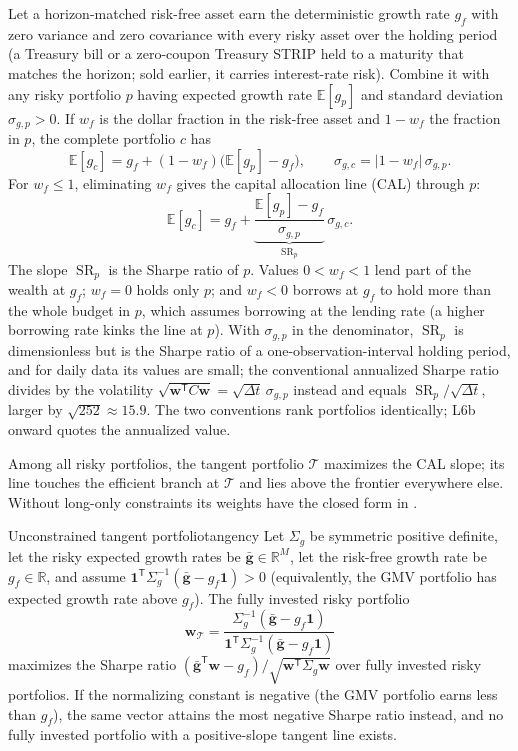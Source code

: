 \documentclass[11pt]{article}
\newcommand{\R}{\mathbb{R}}
\newcommand{\E}{\mathbb{E}}
\newcommand{\SR}{\operatorname{SR}}
\begin{document}
Let a horizon-matched risk-free asset earn the deterministic growth rate $g_f$ with zero variance and zero covariance with every risky asset over the holding period (a Treasury bill or a zero-coupon Treasury STRIP held to a maturity that matches the horizon; sold earlier, it carries interest-rate risk). Combine it with any risky portfolio $p$ having expected growth rate $\E[g_p]$ and standard deviation $\sigma_{g,p}>0$. If $w_f$ is the dollar fraction in the risk-free asset and $1-w_f$ the fraction in $p$, the complete portfolio $c$ has
\begin{equation}
  \label{eq:cal}
  \E[g_c]=g_f+(1-w_f)\bigl(\E[g_p]-g_f\bigr),
  \qquad
  \sigma_{g,c}=|1-w_f|\,\sigma_{g,p}.
\end{equation}
For $w_f\leq1$, eliminating $w_f$ gives the capital allocation line (CAL) through $p$:
\begin{equation}
  \label{eq:cal-line}
  \E[g_c]=g_f+\underbrace{\frac{\E[g_p]-g_f}{\sigma_{g,p}}}_{\SR_p}\,\sigma_{g,c}.
\end{equation}
The slope $\SR_p$ is the Sharpe ratio of $p$. Values $0<w_f<1$ lend part of the wealth at $g_f$; $w_f=0$ holds only $p$; and $w_f<0$ borrows at $g_f$ to hold more than the whole budget in $p$, which assumes borrowing at the lending rate (a higher borrowing rate kinks the line at $p$). With $\sigma_{g,p}$ in the denominator, $\SR_p$ is dimensionless but is the Sharpe ratio of a one-observation-interval holding period, and for daily data its values are small; the conventional annualized Sharpe ratio divides by the volatility $\sqrt{\mathbf w^{\mathsf T}C\mathbf w}=\sqrt{\Delta t}\,\sigma_{g,p}$ instead and equals $\SR_p/\sqrt{\Delta t}$, larger by $\sqrt{252}\approx15.9$. The two conventions rank portfolios identically; L6b onward quotes the annualized value.

Among all risky portfolios, the tangent portfolio $\mathcal T$ maximizes the CAL slope; its line touches the efficient branch at $\mathcal T$ and lies above the frontier everywhere else. Without long-only constraints its weights have the closed form in .

\begin{proposition}{Unconstrained tangent portfolio}{tangency}
Let $\Sigma_g$ be symmetric positive definite, let the risky expected growth rates be $\bar{\mathbf g}\in\R^M$, let the risk-free growth rate be $g_f\in\R$, and assume $\mathbf1^{\mathsf T}\Sigma_g^{-1}(\bar{\mathbf g}-g_f\mathbf1)>0$ (equivalently, the GMV portfolio has expected growth rate above $g_f$). The fully invested risky portfolio
\begin{equation}
  \label{eq:tangency}
  \mathbf w_{\mathcal T}=
  \frac{\Sigma_g^{-1}(\bar{\mathbf g}-g_f\mathbf1)}
  {\mathbf1^{\mathsf T}\Sigma_g^{-1}(\bar{\mathbf g}-g_f\mathbf1)}
\end{equation}
maximizes the Sharpe ratio $(\bar{\mathbf g}^{\mathsf T}\mathbf w-g_f)/\sqrt{\mathbf w^{\mathsf T}\Sigma_g\mathbf w}$ over fully invested risky portfolios. If the normalizing constant is negative (the GMV portfolio earns less than $g_f$), the same vector attains the most negative Sharpe ratio instead, and no fully invested portfolio with a positive-slope tangent line exists.
\end{proposition}
\end{document}
